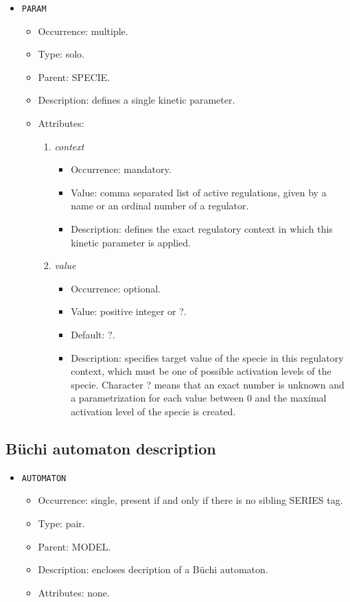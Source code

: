 \documentclass[12pt]{article}
\newenvironment{menum}{
\begin{enumerate}
  \setlength{\itemsep}{0pt}
  \setlength{\parskip}{0pt}
  \setlength{\parsep}{0pt}
}{\end{enumerate}}
\newenvironment{mitem}{
\begin{itemize}
  \setlength{\itemsep}{0pt}
  \setlength{\parskip}{0pt}
  \setlength{\parsep}{0pt}
}{\end{itemize}}
\begin{document}
\begin{mitem}
	\item \texttt{PARAM}
	\begin{mitem}
		\item Occurrence: multiple.
		\item Type: solo.
		\item Parent: SPECIE.
		\item Description: defines a single kinetic parameter.
		\item Attributes:	
		\begin{menum}
			\item \textit{context} 
			\begin{mitem}
				\item Occurrence: mandatory.
				\item Value: comma separated list of active regulations, given by a name or an ordinal number of a regulator.
				\item Description: defines the exact regulatory context in which this kinetic parameter is applied.
			\end{mitem}
			\item \textit{value} 
			\begin{mitem}
				\item Occurrence: optional.
				\item Value: positive integer or ?.
				\item Default: ?.
				\item Description: specifies target value of the specie in this regulatory context, which must be one of possible activation levels of the specie. Character ? means that an exact number is unknown and a parametrization for each value between 0 and the maximal activation level of the specie is created.
			\end{mitem}
		\end{menum}
	\end{mitem}
\end{mitem}
	
\subsection{B\"uchi automaton description}		
\begin{mitem}
	\item \texttt{AUTOMATON}
	\begin{mitem}
		\item Occurrence: single, present if and only if there is no sibling SERIES tag.
		\item Type: pair.
		\item Parent: MODEL.
		\item Description: encloses decription of a B\"uchi automaton.
		\item Attributes: none.
	\end{mitem}
\end{mitem}		
\end{document}
